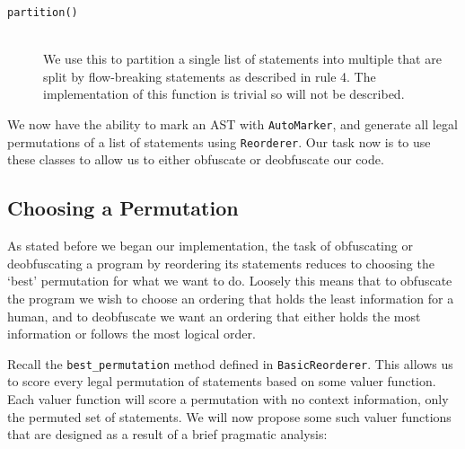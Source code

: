 \documentclass[twoside,a4paper]{report}
\begin{document}
\begin{description}
\item[\texttt{partition()}] \hfill \\
We use this to partition a single list of statements into multiple that are split by flow-breaking statements as described in rule 4. The implementation of this
function is trivial so will not be described.
\end{description}

We now have the ability to mark an AST with \texttt{AutoMarker}, and generate all legal permutations of a list of statements using \texttt{Reorderer}. Our task
now is to use these classes to allow us to either obfuscate or deobfuscate our code.

\subsection{Choosing a Permutation}

As stated before we began our implementation, the task of obfuscating or deobfuscating a program by reordering its statements reduces to choosing the `best'
permutation for what we want to do. Loosely this means that to obfuscate the program we wish to choose an ordering that holds the least information for a
human, and to deobfuscate we want an ordering that either holds the most information or follows the most logical order.

Recall the \texttt{best\_permutation} method defined in \texttt{BasicReorderer}. This allows us to score every legal permutation of statements based on some
valuer function. Each valuer function will score a permutation with no context information, only the permuted set of statements. We will now propose some
such valuer functions that are designed as a result of a brief pragmatic analysis:
\end{document}
